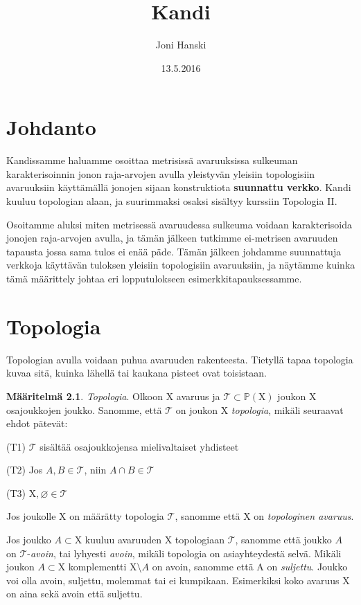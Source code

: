 \documentclass[12pt,a4paper,leqno]{report}
\title{Kandi}
\author{Joni Hanski}
\date{13.5.2016}
\newcommand{\X}{\mathrm{X}}
\newcommand{\Pow}{\mathbb{P}}
\newcommand{\T}{\mathcal{T}}
\theoremstyle{plain}
\theoremstyle{definition}
\newtheorem{maar}[equation]{Määritelmä}
\theoremstyle{remark}
\begin{document}
\maketitle

\tableofcontents

\chapter{Johdanto}\label{johd}

Kandissamme haluamme osoittaa metrisissä avaruuksissa sulkeuman karakterisoinnin jonon raja-arvojen avulla yleistyvän yleisiin topologisiin avaruuksiin käyttämällä jonojen sijaan konstruktiota \textbf{suunnattu verkko}. Kandi kuuluu topologian alaan, ja suurimmaksi osaksi sisältyy kurssiin Topologia II.

Osoitamme aluksi miten metrisessä avaruudessa sulkeuma voidaan karakterisoida jonojen raja-arvojen avulla, ja tämän jälkeen tutkimme ei-metrisen avaruuden tapausta jossa sama tulos ei enää päde. Tämän jälkeen johdamme suunnattuja verkkoja käyttävän tuloksen yleisiin topologisiin avaruuksiin, ja näytämme kuinka tämä määrittely johtaa eri lopputulokseen esimerkkitapauksessamme.

\chapter{Topologia}\label{TOP}

Topologian avulla voidaan puhua avaruuden rakenteesta. Tietyllä tapaa topologia kuvaa sitä, kuinka lähellä tai kaukana pisteet ovat toisistaan.

\begin{maar}\label{topmaar}
\emph{Topologia}. Olkoon $\X$ avaruus ja $\T \subset \Pow(\X)$ joukon $\X$ osajoukkojen joukko. Sanomme, että $\T$ on joukon $\X$ \emph{topologia}, mikäli seuraavat ehdot pätevät:

(T1) $\T$ sisältää osajoukkojensa mielivaltaiset yhdisteet

(T2) Jos $A,B \in \T$, niin $A \cap B \in \T$

(T3) $\X, \varnothing \in \T$
\end{maar}

Jos joukolle $\X$ on määrätty topologia $\T$, sanomme että $\X$ on \emph{topologinen avaruus}.

Jos joukko $A \subset \X$ kuuluu avaruuden $\X$ topologiaan $\T$, sanomme että joukko $A$ on $\T$-\emph{avoin}, tai lyhyesti \emph{avoin}, mikäli topologia on asiayhteydestä selvä. Mikäli joukon $A \subset \X$ komplementti $\X \setminus A$ on avoin, sanomme että A on \emph{suljettu}. Joukko voi olla avoin, suljettu, molemmat tai ei kumpikaan. Esimerkiksi koko avaruus $\X$ on aina sekä avoin että suljettu.
\end{document}
